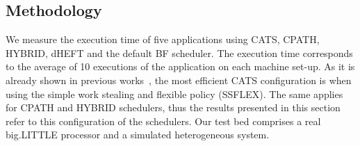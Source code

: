 \subsection{Methodology}



We measure the execution time of five applications using CATS, CPATH, HYBRID, dHEFT and the default BF scheduler. 
The execution time corresponds to the average of 10 executions of the application on each machine set-up.
As it is already shown in previous works~\cite{Chronaki:ICS2015}, the most efficient CATS configuration is when using the simple work stealing and flexible policy (SSFLEX).
The same applies for CPATH and HYBRID schedulers, thus the results presented in this section refer to this configuration of the schedulers. 
\fi %
Our test bed comprises a real big.LITTLE processor and a simulated heterogeneous system.


